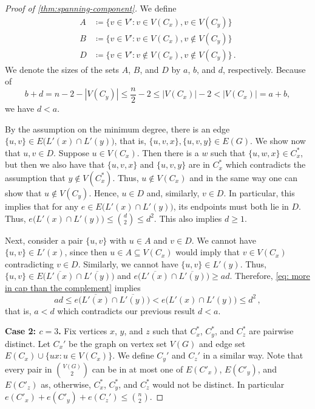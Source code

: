 \documentclass[12pt,reqno]{amsart}
\theoremstyle{plain}
\theoremstyle{definition}
\numberwithin{equation}{section}
\newcommand{\subs}{\subseteq}
\newcommand{\abs}[1]{\left\lvert#1\right\rvert}
\begin{document}
\begin{proof}[Proof of \cref{thm:spanning-component}]
		We define
		\begin{align*}A &\coloneqq \big\{v\in V'\colon v\in V(C_x), v\in V(C_y)\big\}\\
			B &\coloneqq \big\{v\in V'\colon v\in V(C_x), v\not\in V(C_y)\big\}\\
			D &\coloneqq \big\{v\in V'\colon v\not\in V(C_x), v\not\in V(C_y)\big\}\,.
		\end{align*}
		We denote the sizes of the sets $A$, $B$, and $D$ by $a$, $b$, and $d$, respectively.
		Because of \[b+d=n-2-\abs{V(C_y)}\le \frac{n}{2}-2\le \abs{V(C_x)}-2<\abs{V(C_x)}=a+b,\]
		we have $d< a$.
		
		By the assumption on the minimum degree, there is an edge $\{u,v\}\in E\big(L'(x)\cap L'(y)\big)$, that is,  $\{u,v,x\},\{u,v,y\}\in E(G)$.
		We show now that $u,v\in D$. Suppose $u\in V(C_x)$. Then there is a $w$ such that $\{u,w,x\}\in C_x^\ast$, but then we also have that $\{u,v,x\}$ and $\{u,v,y\}$ are in $C_x^\ast$ which contradicts the assumption that $y\not\in V(C_x^\ast)$. Thus, $u\not\in V(C_x)$ and in the same way one can show that $u\not\in V(C_y)$. Hence, $u\in D$ and, similarly, $v\in D$. In particular, this implies that for any $e\in E\big(L'(x)\cap L'(y)\big)$, its endpoints must both lie in $D$. Thus, $e\big(L'(x)\cap L'(y)\big)\le \binom{d}{2}\le d^2$. This also implies $d\ge 1$.
		
		Next, consider a pair $\{u,v\}$ with $u\in A$ and $v\in D$. We cannot have $\{u,v\}\in L'(x)$, since then $u\in A\subs V(C_x)$ would imply that $v\in V(C_x)$ contradicting $v\in D$. Similarly, we cannot have $\{u,v\}\in L'(y)$. Thus, $\{u,v\}\in E\big(\overline{L'(x)}\cap\overline{L'(y)}\big)$ and
		$e\big(\overline{L'(x)}\cap\overline{L'(y)}\big)\ge ad$. Therefore, \eqref{eq: more in cap than the complement} implies
		\[ad\le e\big(\overline{L'(x)}\cap\overline{L'(y)}\big)<e\big(L'(x)\cap L'(y)\big)\le d^2\,,\]
		that is, $a<d$ which contradicts our previous result $d< a$.
		
		\medskip
		\textbf{Case 2: $c=3$.}
		Fix vertices $x$, $y$, and $z$ such that $C_x^\ast$, $C_y^\ast$, and $C_z^\ast$ are pairwise distinct. Let $C_x'$ be the graph on vertex set $V(G)$ and edge set $E(C_x)\cup\{ux\colon u\in V(C_x)\}$. We define $C_y'$ and $C_z'$ in a similar way. Note that every pair in $\binom{V(G)}{2}$ can be in at most one of $E(C'_x)$, $E(C'_y)$, and $E(C'_z)$ as, otherwise, $C_x^\ast$, $C_y^\ast$, and $C_z^\ast$ would not be distinct. In particular $e(C'_x)+e(C'_y)+e(C_z')\le \binom{n}{2}$.
		

\end{proof}
\end{document}
